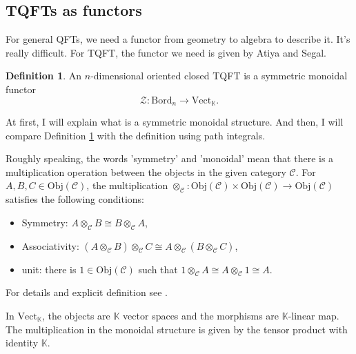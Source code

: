 \documentclass[10pt,reqno,final]{article}
\numberwithin{equation}{section}
\numberwithin{figure}{section}
\numberwithin{table}{section}
\theoremstyle{plain}
\theoremstyle{definition}
\newtheorem{definition}[theorem]{Definition}
\theoremstyle{remark}
\begin{document}
    \subsection{TQFTs as functors}
    For general QFTs, we need a functor from geometry to algebra to describe it. It's really difficult. For TQFT, the functor we need is given by Atiya and Segal\cite{atiyahTopologicalQuantumField1988,segalDefinitionConformalField1988}.
    \begin{definition}\label{def:AS-TQFT}
      An \(n\)-dimensional oriented closed TQFT is a symmetric monoidal functor 
      \begin{equation}
        \mathcal{Z}:\mathrm{Bord}_{n}\to \mathrm{Vect}_{\mathbb{K}}.
      \end{equation}
    \end{definition}
    
    At first, I will explain what is a symmetric monoidal structure. And then, I will compare Definition \ref{def:AS-TQFT} with the definition using path integrals. 

    Roughly speaking, the words 'symmetry' and 'monoidal' mean that there is a multiplication operation between the objects in the given category \(\mathcal{C}\). For \(A,B,C\in \mathrm{Obj}(\mathcal{C})\), the multiplication \(\otimes_{\mathcal{C}} :\mathrm{Obj}(\mathcal{C})\times \mathrm{Obj}(\mathcal{C})\to \mathrm{Obj}(\mathcal{C})\) satisfies the following conditions:
    \begin{itemize}
        \item Symmetry: \(A\otimes_{\mathcal{C}} B\cong B\otimes_{\mathcal{C}} A\),
        \item Associativity: \((A\otimes_{\mathcal{C}} B)\otimes_{\mathcal{C}} C\cong A\otimes_{\mathcal{C}} (B\otimes_{\mathcal{C}} C)\),
        \item unit: there is \(1\in \mathrm{Obj}(\mathcal{C})\) such that \(1\otimes_{\mathcal{C}} A\cong A\otimes_{\mathcal{C}} 1\cong A\).
    \end{itemize}
    For details and explicit definition see \cite{etingofTensorCategories2015}. 

    In \(\mathrm{Vect}_{\mathbb{K}}\), the objects are \(\mathbb{K}\) vector spaces and the morphisms are \(\mathbb{K}\)-linear map. The multiplication in the monoidal structure is given by the tensor product with identity \(\mathbb{K}\). 
\end{document}
